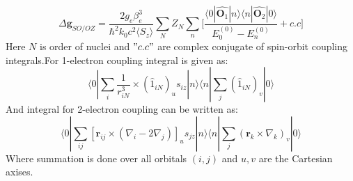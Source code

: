 \begin{equation}\label{eq:zeemanparamagn}
\Delta \pmb{g}_{SO/OZ}=\frac{2g_e\beta_e^3}{\hbar^2k_0c^2\langle S_z\rangle}\sum_N Z_N\sum_n\Bigg[ \frac{\langle0|\hat{\pmb{O}_1}|n\rangle\langle n|\hat{\pmb{O}_2}|0\rangle}{E_0^{(0)}-E_n^{(0)}}+c.c\Bigg]
\end{equation} 
Here $N$ is order of nuclei and $"c.c"$ are complex conjugate of spin-orbit coupling integrals.For 1-electron coupling integral is given as:
\begin{equation}\label{eq:oneel1}
\langle 0|\sum_i\frac{1}{r^3_{iN}}\times(\hat1_{iN})_us_{iz}|n\rangle\langle n|\sum_j(\hat1_{iN})_v|0\rangle
\end{equation}
And integral for 2-electron coupling can be written as:
\begin{equation}\label{eq:oneel2}
\langle 0|\sum_{ij}[\pmb{r}_{ij}\times(\nabla_i-2\nabla_j)]_us_{jz}|n\rangle\langle n|\sum_j(\pmb{r}_k\times\nabla_k)_v|0\rangle
\end{equation}
Where summation is done over all orbitals $(i,j)$ and $u,v$ are the Cartesian axises.
